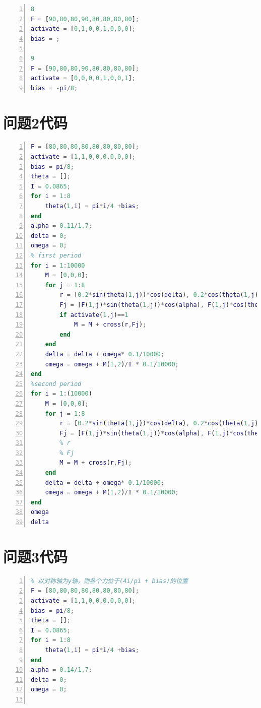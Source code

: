 \documentclass[nocover]{cumcmart}%
\begin{document}
\begin{appendix}
\begin{lstlisting}[language=Matlab,numbers=left, numberstyle=\tiny,keywordstyle=\color{blue!70},commentstyle=\color{red!50!green!50!blue!50},frame=shadowbox, rulesepcolor=\color{red!20!green!20!blue!20}]
8
F = [90,80,80,90,80,80,80,80];
activate = [0,1,0,0,1,0,0,0];
bias = ;

9
F = [90,80,80,90,80,80,80,80];
activate = [0,0,0,0,1,0,0,1];
bias = -pi/8;

\end{lstlisting}

\section{问题2代码}
\lstset{breaklines}
\begin{lstlisting}[language=Matlab,numbers=left, numberstyle=\tiny,keywordstyle=\color{blue!70},commentstyle=\color{red!50!green!50!blue!50},frame=shadowbox, rulesepcolor=\color{red!20!green!20!blue!20}] 
 % 以对称轴为y轴，则各个力位于(4i/pi + bias)的位置
F = [80,80,80,80,80,80,80,80];
activate = [1,1,0,0,0,0,0,0];
bias = pi/8;
theta = [];
I = 0.0865;
for i = 1:8
    theta(1,i) = pi*i/4 +bias;
end
alpha = 0.11/1.7;
delta = 0;
omega = 0;
% first period
for i = 1:10000
    M = [0,0,0];
    for j = 1:8
        r = [0.2*sin(theta(1,j))*cos(delta), 0.2*cos(theta(1,j)),-0.2*sin(theta(1,j))*sin(delta)];
        Fj = [F(1,j)*sin(theta(1,j))*cos(alpha), F(1,j)*cos(theta(1,j))*cos(alpha), F(1,j)*sin(alpha)];
        if activate(1,j)==1
            M = M + cross(r,Fj);   
        end
    end
    delta = delta + omega* 0.1/10000;
    omega = omega + M(1,2)/I * 0.1/10000;
end
%second period
for i = 1:(10000)
    M = [0,0,0];
    for j = 1:8
        r = [0.2*sin(theta(1,j))*cos(delta), 0.2*cos(theta(1,j)),-0.2*sin(theta(1,j))*sin(delta)];
        Fj = [F(1,j)*sin(theta(1,j))*cos(alpha), F(1,j)*cos(theta(1,j))*cos(alpha), F(1,j)*sin(alpha)];
        % r
        % Fj
        M = M + cross(r,Fj); 
    end
    delta = delta + omega* 0.1/10000;
    omega = omega + M(1,2)/I * 0.1/10000;
end
omega
delta
\end{lstlisting}








\section{问题3代码}
\lstset{breaklines}
\begin{lstlisting}[language=Matlab,numbers=left, numberstyle=\tiny,keywordstyle=\color{blue!70},commentstyle=\color{red!50!green!50!blue!50},frame=shadowbox, rulesepcolor=\color{red!20!green!20!blue!20}] 
% 主要思想是，在鼓上升的过程中，减小鼓的倾斜角
% 以对称轴为y轴，则各个力位于(4i/pi + bias)的位置
F = [80,80,80,80,80,80,80,80];
activate = [1,1,0,0,0,0,0,0];
bias = pi/8;
theta = [];
I = 0.0865;
for i = 1:8
    theta(1,i) = pi*i/4 +bias;
end
alpha = 0.14/1.7;
delta = 0;
omega = 0;


\end{lstlisting}
\end{appendix}
\end{document}
